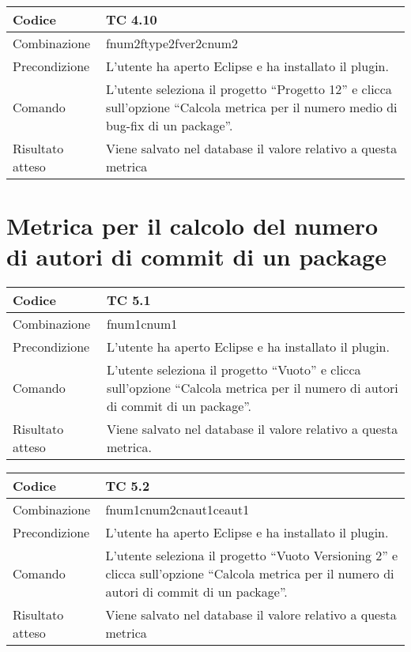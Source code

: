 \begin{table}[ht]
\begin{tabular}{|p{3cm}|p{9cm}|}
\hline
\cellcolor{lightgray}Codice				& TC 4.10								\\
\hline
\cellcolor{lightgray}Combinazione		& fnum2ftype2fver2cnum2 									\\
\hline
\cellcolor{lightgray}Precondizione		& L'utente ha aperto Eclipse e ha installato il plugin.									\\
\hline
\cellcolor{lightgray}Comando			& L'utente seleziona il progetto ``Progetto 12''  e clicca sull'opzione ``Calcola metrica per il numero medio di bug-fix di un package''.	\\
\hline
\cellcolor{lightgray}Risultato atteso	& Viene salvato nel database il valore relativo a questa metrica	\\
\hline
\end{tabular}
\end{table}
\clearpage

\section{Metrica per il calcolo del numero di autori di commit di un package}

\begin{table}[ht]
\begin{tabular}{|p{3cm}|p{9cm}|}
\hline
\cellcolor{lightgray}Codice				& TC 5.1								\\
\hline
\cellcolor{lightgray}Combinazione		& fnum1cnum1									\\
\hline
\cellcolor{lightgray}Precondizione		& L'utente ha aperto Eclipse e ha installato il plugin.		\\
\hline
\cellcolor{lightgray}Comando			& L'utente seleziona il progetto ``Vuoto''  e clicca sull'opzione ``Calcola metrica per il numero di autori di commit di un package''.	\\
\hline
\cellcolor{lightgray}Risultato atteso	& Viene salvato nel database il valore relativo a questa metrica.\\
\hline
\end{tabular}
\end{table}

\begin{table}[ht]
\begin{tabular}{|p{3cm}|p{9cm}|}
\hline
\cellcolor{lightgray}Codice				& TC 5.2								\\
\hline
\cellcolor{lightgray}Combinazione		& fnum1cnum2cnaut1ceaut1 									\\
\hline
\cellcolor{lightgray}Precondizione		& L'utente ha aperto Eclipse e ha installato il plugin.				\\
\hline
\cellcolor{lightgray}Comando			& L'utente seleziona il progetto ``Vuoto Versioning 2''  e clicca sull'opzione ``Calcola metrica per il numero di autori di commit di un package''.	\\
\hline
\cellcolor{lightgray}Risultato atteso	& Viene salvato nel database il valore relativo a questa metrica	\\
\hline
\end{tabular}
\end{table}

